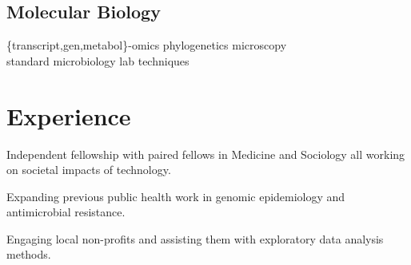 \documentclass[]{Finlay_Maguire_CV}
\begin{document}
\begin{minipage}[t]{0.33\textwidth}
\subsection{Molecular Biology}
\{transcript,gen,metabol\}-omics \textbullet{} phylogenetics \textbullet{} 
microscopy \textbullet{} \\ standard microbiology lab techniques 
\sectionsep



%
%

\end{minipage} 
\hfill
\begin{minipage}[t]{0.66\textwidth} 


\section{Experience}

    \vspace{0.3cm}
\begin{tightemize}
\item Independent fellowship with paired fellows in Medicine and Sociology all working on societal impacts of technology.
\item Expanding previous public health work in genomic epidemiology and antimicrobial resistance.
\item Engaging local non-profits and assisting them with exploratory data analysis methods.
\end{tightemize}


\end{minipage}
\end{document}
